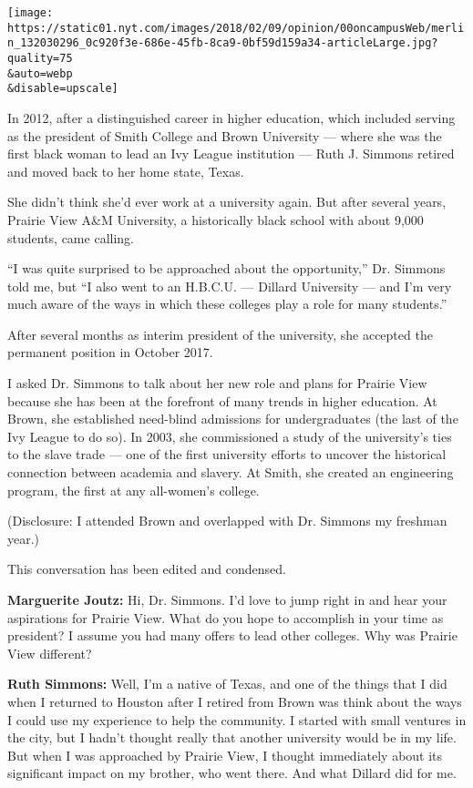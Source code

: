\texttt{[image: https://static01.nyt.com/images/2018/02/09/opinion/00oncampusWeb/merlin\_132030296\_0c920f3e-686e-45fb-8ca9-0bf59d159a34-articleLarge.jpg?quality=75\\\&auto=webp\\\&disable=upscale]}

In 2012, after a distinguished career in higher education, which
included serving as the president of Smith College and Brown University
--- where she was the first black woman to lead an Ivy League
institution --- Ruth J. Simmons retired and moved back to her home
state, Texas.

She didn't think she'd ever work at a university again. But after
several years, Prairie View A\&M University, a historically black school
with about 9,000 students, came calling.

``I was quite surprised to be approached about the opportunity,'' Dr.
Simmons told me, but ``I also went to an H.B.C.U. --- Dillard University
--- and I'm very much aware of the ways in which these colleges play a
role for many students.''

After several months as interim president of the university, she
accepted the permanent position in October 2017.

I asked Dr. Simmons to talk about her new role and plans for Prairie
View because she has been at the forefront of many trends in higher
education. At Brown, she established need-blind admissions for
undergraduates (the last of the Ivy League to do so). In 2003, she
commissioned a study of the university's ties to the slave trade --- one
of the first university efforts to uncover the historical connection
between academia and slavery. At Smith, she created an engineering
program, the first at any all-women's college.

(Disclosure: I attended Brown and overlapped with Dr. Simmons my
freshman year.)

This conversation has been edited and condensed.

\textbf{Marguerite Joutz:} Hi, Dr. Simmons. I'd love to jump right in
and hear your aspirations for Prairie View. What do you hope to
accomplish in your time as president? I assume you had many offers to
lead other colleges. Why was Prairie View different?

\textbf{Ruth Simmons:} Well, I'm a native of Texas, and one of the
things that I did when I returned to Houston after I retired from Brown
was think about the ways I could use my experience to help the
community. I started with small ventures in the city, but I hadn't
thought really that another university would be in my life. But when I
was approached by Prairie View, I thought immediately about its
significant impact on my brother, who went there. And what Dillard did
for me.

